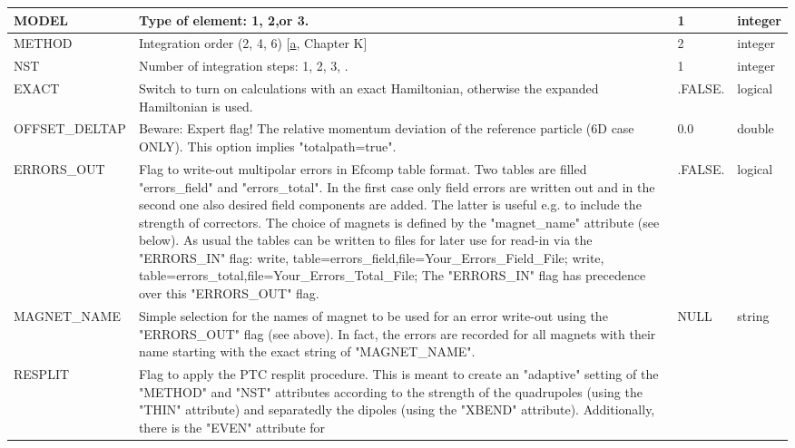 \begin{description}
\begin{longtable}{l p{8cm} p{2cm} p{2cm}}
    \hline
    MODEL &  Type of element: 1, 2,or 3. & 1 & integer \\ 
    \hline
    METHOD & Integration order (2, 4, 6) [\hyperlink{E.Forest}{a},
      Chapter K] & 2 & integer \\  
    \hline
    NST & Number of integration steps: 1, 2, 3,  . & 1 & integer \\ 
    \hline
    EXACT & Switch to turn on calculations with an exact Hamiltonian,
    otherwise the expanded Hamiltonian is used. & .FALSE. & logical \\  
    \hline
    OFFSET\_DELTAP & Beware: Expert flag! The relative momentum
    deviation of the reference particle (6D case ONLY). This option
    implies "totalpath=true". & 0.0 & double \\  
    \hline
    ERRORS\_OUT & Flag to write-out multipolar errors in Efcomp table
    format. Two     tables are filled "errors\_field"     and
    "errors\_total". In the first     case only field errors are written
    out and in the second one also     desired field components are
    added. The latter is useful e.g. to     include the strength of
    correctors. The choice of magnets is     defined by the
    "magnet\_name"     attribute (see below). As usual the tables can be
    written to files for later use for read-in via the "ERRORS\_IN"
    flag:\newline
    \newline
    write, table=errors\_field,file=Your\_Errors\_Field\_File;\newline
    write, table=errors\_total,file=Your\_Errors\_Total\_File;\newline
    \newline
    The "ERRORS\_IN" flag has precedence over     this "ERRORS\_OUT" flag.   & 
    .FALSE. & logical \\
    \hline
    MAGNET\_NAME & 
    Simple selection for the names of magnet to be used for an error
    write-out   using the "ERRORS\_OUT" flag (see above).   In fact, the
    errors are recorded for all magnets with their name starting with
    the exact string of "MAGNET\_NAME".   &  
    NULL & string \\
    \hline
    RESPLIT & 
    Flag to apply the PTC resplit procedure. This is meant to
    create an "adaptive" setting of the "METHOD" and  "NST"  attributes
    according to the        strength of the quadrupoles (using the
    "THIN"  attribute) and separatedly the dipoles (using the "XBEND"
    attribute). Additionally, there        is the  "EVEN" attribute for

\end{longtable}
\end{description}

